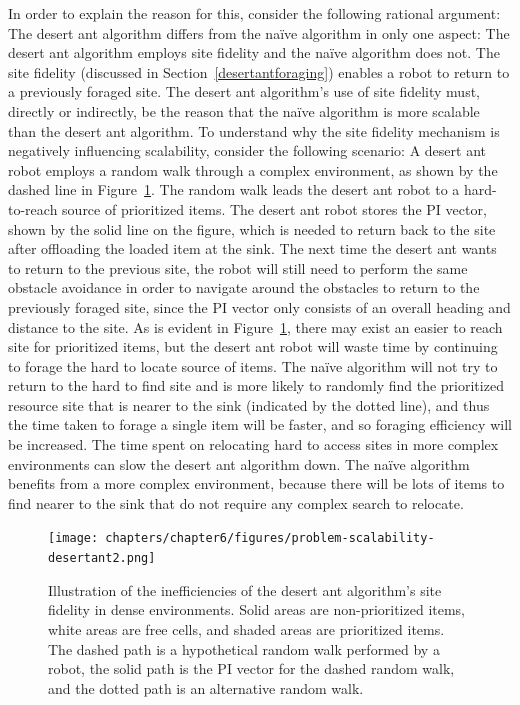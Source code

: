 In order to explain the reason for this, consider the following rational argument: The desert ant algorithm differs from the na\"ive algorithm in only one aspect: The desert ant algorithm employs site fidelity and the na\"ive algorithm does not. The site fidelity (discussed in Section~\ref{desertantforaging}) enables a robot to return to a previously foraged site. The desert ant algorithm's use of site fidelity must, directly or indirectly, be the reason that the na\"ive algorithm is more scalable than the desert ant algorithm. To understand why the site fidelity mechanism is negatively influencing scalability, consider the following scenario: A desert ant robot employs a random walk through a complex environment, as shown by the dashed line in Figure~\ref{fig:desertantsitefidelity}. The random walk leads the desert ant robot to a hard-to-reach source of prioritized items. The desert ant robot stores the PI vector, shown by the solid line on the figure, which is needed to return back to the site after offloading the loaded item at the sink. The next time the desert ant wants to return to the previous site, the robot will still need to perform the same obstacle avoidance in order to navigate around the obstacles to return to the previously foraged site, since the PI vector only consists of an overall heading and distance to the site. As is evident in Figure~\ref{fig:desertantsitefidelity}, there may exist an easier to reach site for prioritized items, but the desert ant robot will waste time by continuing to forage the hard to locate source of items. The na\"ive algorithm will not try to return to the hard to find site and is more likely to randomly find the prioritized resource site that is nearer to the sink (indicated by the dotted line), and thus the time taken to forage a single item will be faster, and so foraging efficiency will be increased. The time spent on relocating hard to access sites in more complex environments can slow the desert ant algorithm down. The na\"ive algorithm benefits from a more complex environment, because there will be lots of items to find nearer to the sink that do not require any complex search to relocate. 

\begin{figure}[!htbp]
    \centering
    \texttt{[image: chapters/chapter6/figures/problem-scalability-desertant2.png]}
    \caption{Illustration of the inefficiencies of the desert ant algorithm's site fidelity in dense environments. Solid areas are non-prioritized items, white areas are free cells, and shaded areas are prioritized items. The dashed path is a hypothetical random walk performed by a robot, the solid path is the PI vector for the dashed random walk, and the dotted path is an alternative random walk.}
    \label{fig:desertantsitefidelity}
\end{figure}

